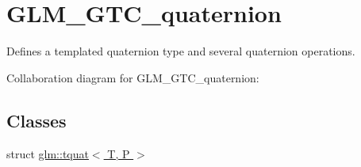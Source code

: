 \hypertarget{group__gtc__quaternion}{\section{G\-L\-M\-\_\-\-G\-T\-C\-\_\-quaternion}
\label{group__gtc__quaternion}
}


Defines a templated quaternion type and several quaternion operations.  


Collaboration diagram for G\-L\-M\-\_\-\-G\-T\-C\-\_\-quaternion\-:
\subsection*{Classes}
\begin{DoxyCompactItemize}
\item 
struct \hyperlink{structglm_1_1tquat}{glm\-::tquat$<$ T, P $>$}
\end{DoxyCompactItemize}
